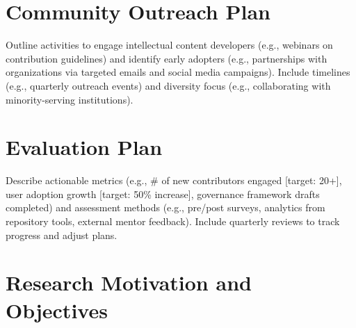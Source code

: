\documentclass[11pt]{article}
\begin{document}
\section*{Community Outreach Plan}
\vspace{-3pt}
\noindent
Outline activities to engage intellectual content developers (e.g., webinars on contribution guidelines) and identify early adopters (e.g., partnerships with organizations via targeted emails and social media campaigns). Include timelines (e.g., quarterly outreach events) and diversity focus (e.g., collaborating with minority-serving institutions).
\vspace{-3pt}


\section*{Evaluation Plan}
\vspace{-3pt}
\noindent
Describe actionable metrics (e.g., \# of new contributors engaged [target: 20+], user adoption growth [target: 50\% increase], governance framework drafts completed) and assessment methods (e.g., pre/post surveys, analytics from repository tools, external mentor feedback). Include quarterly reviews to track progress and adjust plans.
\vspace{-3pt}

\newpage
\maketitle
\thispagestyle{empty} %
\vspace{-45pt}
\section{Research Motivation and Objectives}
\label{sec:intro}
\end{document}
